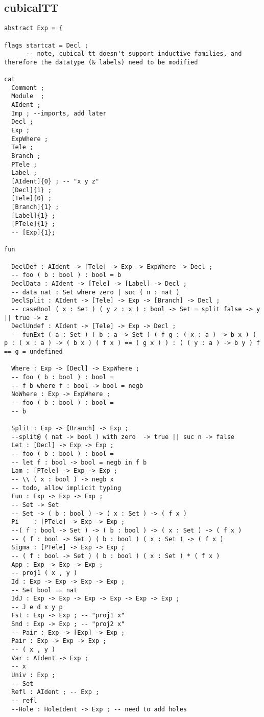 



\subsection{cubicalTT} \label{cubicaltt}
\begin{verbatim}
abstract Exp = {

flags startcat = Decl ;
      -- note, cubical tt doesn't support inductive families, and therefore the datatype (& labels) need to be modified

cat
  Comment ;
  Module  ;
  AIdent ;
  Imp ; --imports, add later
  Decl ;
  Exp ;
  ExpWhere ;
  Tele ;
  Branch ;
  PTele ;
  Label ;
  [AIdent]{0} ; -- "x y z"
  [Decl]{1} ;
  [Tele]{0} ;
  [Branch]{1} ;
  [Label]{1} ;
  [PTele]{1} ;
  -- [Exp]{1};

fun

  DeclDef : AIdent -> [Tele] -> Exp -> ExpWhere -> Decl ;
  -- foo ( b : bool ) : bool = b
  DeclData : AIdent -> [Tele] -> [Label] -> Decl ;
  -- data nat : Set where zero | suc ( n : nat )
  DeclSplit : AIdent -> [Tele] -> Exp -> [Branch] -> Decl ;
  -- caseBool ( x : Set ) ( y z : x ) : bool -> Set = split false -> y || true -> z
  DeclUndef : AIdent -> [Tele] -> Exp -> Decl ;
  -- funExt ( a : Set ) ( b : a -> Set ) ( f g : ( x : a ) -> b x ) ( p : ( x : a ) -> ( b x ) ( f x ) == ( g x ) ) : ( ( y : a ) -> b y ) f == g = undefined

  Where : Exp -> [Decl] -> ExpWhere ;
  -- foo ( b : bool ) : bool =
  -- f b where f : bool -> bool = negb
  NoWhere : Exp -> ExpWhere ;
  -- foo ( b : bool ) : bool =
  -- b

  Split : Exp -> [Branch] -> Exp ;
  --split@ ( nat -> bool ) with zero  -> true || suc n -> false
  Let : [Decl] -> Exp -> Exp ;
  -- foo ( b : bool ) : bool =
  -- let f : bool -> bool = negb in f b
  Lam : [PTele] -> Exp -> Exp ;
  -- \\ ( x : bool ) -> negb x
  -- todo, allow implicit typing
  Fun : Exp -> Exp -> Exp ;
  -- Set -> Set
  -- Set -> ( b : bool ) -> ( x : Set ) -> ( f x )
  Pi    : [PTele] -> Exp -> Exp ;
  --( f : bool -> Set ) -> ( b : bool ) -> ( x : Set ) -> ( f x )
  -- ( f : bool -> Set ) ( b : bool ) ( x : Set ) -> ( f x )
  Sigma : [PTele] -> Exp -> Exp ;
  -- ( f : bool -> Set ) ( b : bool ) ( x : Set ) * ( f x )
  App : Exp -> Exp -> Exp ;
  -- proj1 ( x , y )
  Id : Exp -> Exp -> Exp -> Exp ;
  -- Set bool == nat
  IdJ : Exp -> Exp -> Exp -> Exp -> Exp -> Exp ;
  -- J e d x y p
  Fst : Exp -> Exp ; -- "proj1 x"
  Snd : Exp -> Exp ; -- "proj2 x"
  -- Pair : Exp -> [Exp] -> Exp ;
  Pair : Exp -> Exp -> Exp ;
  -- ( x , y )
  Var : AIdent -> Exp ;
  -- x
  Univ : Exp ;
  -- Set
  Refl : AIdent ; -- Exp ;
  -- refl
  --Hole : HoleIdent -> Exp ; -- need to add holes


\end{verbatim}

